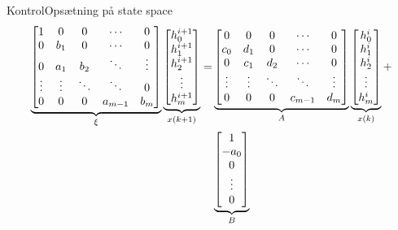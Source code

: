 \begin{frame}{Kontrol}{Opsætning på state space}
\vfill \vfill \centering
 \begin{equation*}
\begin{aligned}
	   \underbrace{\begin{bmatrix}
	    	1 & 0    & 0    &\cdots &0\\
	    	0 & b_1  & 0    &\cdots &0\\
	    	0 &a_{1} & b_2  &\ddots &\vdots	  \\
	    \vdots&\vdots&\ddots&\ddots & 0  \\
	        0 & 0    &0  	&a_{m-1}&  b_m\\
	   \end{bmatrix}}_{\xi}
	    \underbrace{\begin{bmatrix}
		h_{0}^{i+1}\\
		h_{1}^{i+1} \\
		h_{2}^{i+1} \\			
		\vdots		\\
		h_{m}^{i+1}\\
	\end{bmatrix}}_{x(k+1)}
	=& 
	\underbrace{\begin{bmatrix}
	    	0 &  0   &   0    & \cdots   &0\\
	    c_{0} & d_1  &   0    &  \cdots  &0\\
	    0	  &c_{1} & d_2    & \cdots   &0 \\
	    \vdots&\vdots&\ddots  & \ddots   & \vdots\\
	    0	  & 0    &  0     &  c_{m-1} &  d_m\\
	    \end{bmatrix}}_{A}
	    	\underbrace{\begin{bmatrix}
		h_{0}^{i} \\
		h_{1}^{i} \\
		h_{2}^{i}\\
		\vdots		\\
		h_{m}^{i}\\
		\end{bmatrix}}_{x(k)}
	+ \\ \vspace{5mm} & \underbrace{\begin{bmatrix}
		 1\\
		 -a_0 \\
		 0\\
		 \vdots \\
		 0\\
		\end{bmatrix}}_{B}

\end{aligned}
\end{equation*}
\end{frame}
